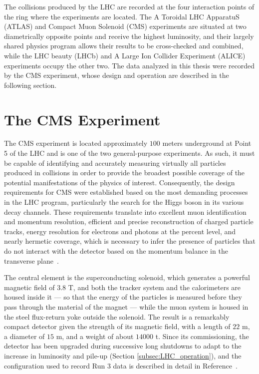 The collisions produced by the LHC are recorded at the four interaction points of the ring where the experiments are located. The A Toroidal LHC ApparatuS (ATLAS) and Compact Muon Solenoid (CMS) experiments are situated at two diametrically opposite points and receive the highest luminosity, and their largely shared physics program allows their results to be cross-checked and combined, while the LHC beauty (LHCb) and A Large Ion Collider Experiment (ALICE) experiments occupy the other two. The data analyzed in this thesis were recorded by the CMS experiment, whose design and operation are described in the following section.



\section{The CMS Experiment}
\label{sec:CMS}
%
The CMS experiment is located approximately $100$ meters underground at Point 5 of the LHC and is one of the two general-purpose experiments. As such, it must be capable of identifying and accurately measuring virtually all particles produced in collisions in order to provide the broadest possible coverage of the potential manifestations of the physics of interest. Consequently, the design requirements for CMS were established based on the most demanding processes in the LHC program, particularly the search for the Higgs boson in its various decay channels. These requirements translate into excellent muon identification and momentum resolution, efficient and precise reconstruction of charged particle tracks, energy resolution for electrons and photons at the percent level, and nearly hermetic coverage, which is necessary to infer the presence of particles that do not interact with the detector based on the momentum balance in the transverse plane~\cite{CMS:2008xjf}.

The central element is the superconducting solenoid, which generates a powerful magnetic field of $3.8$ T, and both the tracker system and the calorimeters are housed inside it — so that the energy of the particles is measured before they pass through the material of the magnet — while the muon system is housed in the steel flux-return yoke outside the solenoid. The result is a remarkably compact detector given the strength of its magnetic field, with a length of $22$ m, a diameter of $15$ m, and a weight of about $14000$ t. Since its commissioning, the detector has been upgraded during successive long shutdowns to adapt to the increase in luminosity and pile-up (Section \ref{subsec:LHC_operation}), and the configuration used to record Run 3 data is described in detail in Reference~\cite{CMS:2023gfb}.

